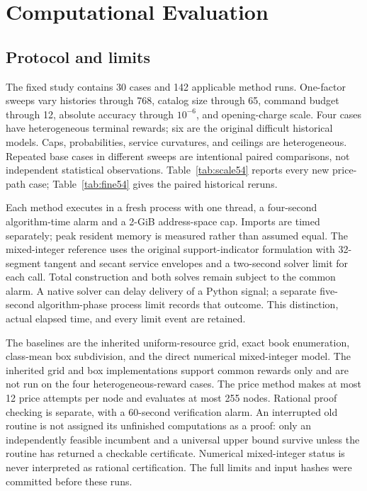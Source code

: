 \section{Computational Evaluation}\label{sec:study54}
\subsection{Protocol and limits}
The fixed study contains 30 cases and 142 applicable method runs. One-factor sweeps vary histories through 768, catalog size through 65, command budget through 12, absolute accuracy through $10^{-6}$, and opening-charge scale. Four cases have heterogeneous terminal rewards; six are the original difficult historical models. Caps, probabilities, service curvatures, and ceilings are heterogeneous. Repeated base cases in different sweeps are intentional paired comparisons, not independent statistical observations. Table~\ref{tab:scale54} reports every new price-path case; Table~\ref{tab:fine54} gives the paired historical reruns.

Each method executes in a fresh process with one thread, a four-second algorithm-time alarm and a 2-GiB address-space cap. Imports are timed separately; peak resident memory is measured rather than assumed equal. The mixed-integer reference uses the original support-indicator formulation with 32-segment tangent and secant service envelopes and a two-second solver limit for each call. Total construction and both solves remain subject to the common alarm. A native solver can delay delivery of a Python signal; a separate five-second algorithm-phase process limit records that outcome. This distinction, actual elapsed time, and every limit event are retained.

The baselines are the inherited uniform-resource grid, exact book enumeration, class-mean box subdivision, and the direct numerical mixed-integer model. The inherited grid and box implementations support common rewards only and are not run on the four heterogeneous-reward cases. The price method makes at most 12 price attempts per node and evaluates at most 255 nodes. Rational proof checking is separate, with a 60-second verification alarm. An interrupted old routine is not assigned its unfinished computations as a proof: only an independently feasible incumbent and a universal upper bound survive unless the routine has returned a checkable certificate. Numerical mixed-integer status is never interpreted as rational certification. The full limits and input hashes were committed before these runs.

